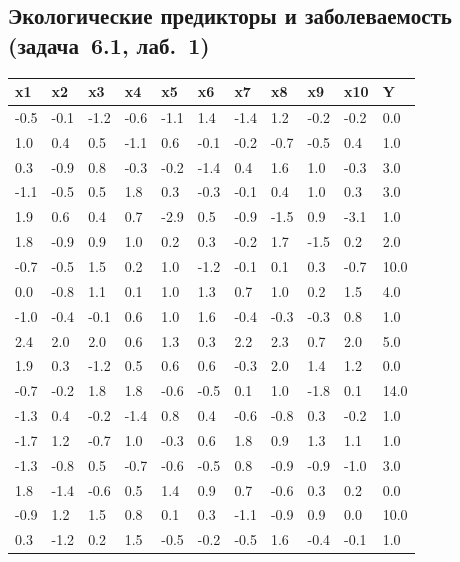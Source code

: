 \subsection{Экологические предикторы и заболеваемость (задача~6.1, лаб.~1)}
\label{app:data-sick}
\begin{center}
\footnotesize
\begin{tabular}{@{}lllllllllll@{}}
 \toprule
\textbf{x1} & \textbf{x2} & \textbf{x3} & \textbf{x4} & \textbf{x5} & \textbf{x6} & \textbf{x7} & \textbf{x8} & \textbf{x9} & \textbf{x10} & \textbf{Y} \\
 \midrule
-0.5 & -0.1 & -1.2 & -0.6 & -1.1 & 1.4 & -1.4 & 1.2 & -0.2 & -0.2 & 0.0 \\
1.0 & 0.4 & 0.5 & -1.1 & 0.6 & -0.1 & -0.2 & -0.7 & -0.5 & 0.4 & 1.0 \\
0.3 & -0.9 & 0.8 & -0.3 & -0.2 & -1.4 & 0.4 & 1.6 & 1.0 & -0.3 & 3.0 \\
-1.1 & -0.5 & 0.5 & 1.8 & 0.3 & -0.3 & -0.1 & 0.4 & 1.0 & 0.3 & 3.0 \\
1.9 & 0.6 & 0.4 & 0.7 & -2.9 & 0.5 & -0.9 & -1.5 & 0.9 & -3.1 & 1.0 \\
1.8 & -0.9 & 0.9 & 1.0 & 0.2 & 0.3 & -0.2 & 1.7 & -1.5 & 0.2 & 2.0 \\
-0.7 & -0.5 & 1.5 & 0.2 & 1.0 & -1.2 & -0.1 & 0.1 & 0.3 & -0.7 & 10.0 \\
0.0 & -0.8 & 1.1 & 0.1 & 1.0 & 1.3 & 0.7 & 1.0 & 0.2 & 1.5 & 4.0 \\
-1.0 & -0.4 & -0.1 & 0.6 & 1.0 & 1.6 & -0.4 & -0.3 & -0.3 & 0.8 & 1.0 \\
2.4 & 2.0 & 2.0 & 0.6 & 1.3 & 0.3 & 2.2 & 2.3 & 0.7 & 2.0 & 5.0 \\
1.9 & 0.3 & -1.2 & 0.5 & 0.6 & 0.6 & -0.3 & 2.0 & 1.4 & 1.2 & 0.0 \\
-0.7 & -0.2 & 1.8 & 1.8 & -0.6 & -0.5 & 0.1 & 1.0 & -1.8 & 0.1 & 14.0 \\
-1.3 & 0.4 & -0.2 & -1.4 & 0.8 & 0.4 & -0.6 & -0.8 & 0.3 & -0.2 & 1.0 \\
-1.7 & 1.2 & -0.7 & 1.0 & -0.3 & 0.6 & 1.8 & 0.9 & 1.3 & 1.1 & 1.0 \\
-1.3 & -0.8 & 0.5 & -0.7 & -0.6 & -0.5 & 0.8 & -0.9 & -0.9 & -1.0 & 3.0 \\
1.8 & -1.4 & -0.6 & 0.5 & 1.4 & 0.9 & 0.7 & -0.6 & 0.3 & 0.2 & 0.0 \\
-0.9 & 1.2 & 1.5 & 0.8 & 0.1 & 0.3 & -1.1 & -0.9 & 0.9 & 0.0 & 10.0 \\
0.3 & -1.2 & 0.2 & 1.5 & -0.5 & -0.2 & -0.5 & 1.6 & -0.4 & -0.1 & 1.0 \\

\end{tabular}
\end{center}
